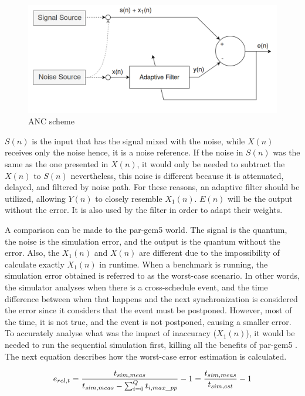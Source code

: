 \begin{figure}[H]
	\centering
 	\includegraphics[width=0.7\linewidth]{Images/AdaptiveNoiseCancellationScheme.png}
 	\caption{ANC scheme}
	 \label{fig_AdaptiveNoiseCancellationScheme}
\end{figure}

$S(n)$ is the input that has the signal mixed with the noise, while $X(n)$ receives only the noise hence, it is a noise reference. If the noise 
in $S(n)$ was the same as the one presented in $X(n)$, it would only be needed to subtract the $X(n)$ to $S(n)$ nevertheless, this noise is 
different because it is attenuated, delayed, and filtered by noise path. For these reasons, an adaptive filter should be utilized, allowing 
$Y(n)$ to closely resemble $X_{1}(n)$. $E(n)$ will be the output without the error. It is also used by the filter in order to adapt their weights.

A comparison can be made to the par-gem5 world. The signal is the quantum, the noise is the simulation error, and the output is the quantum 
without the error. Also, the $X_{1}(n)$ and $X(n)$ are different due to the impossibility of calculate exactly $X_{1}(n)$ in runtime. When a 
benchmark is running, the simulation error obtained is referred to as the worst-case scenario. In other words, the simulator analyses when there 
is a cross-schedule event, and the time difference between when that happens and the next synchronization is considered the error since it 
considers that the event must be postponed. However, most of the time, it is not true, and the event is not postponed, causing a smaller error. To 
accurately analyse what was the impact of inaccuracy ($X_{1}(n)$), it would be needed to run the sequential simulation first, killing 
all the benefits of par-gem5 \cite{pargem5}. The next equation describes how the worst-case error estimation is calculated. 

\begin{equation}
    \label{eq_errSim}
    \centering
        \Large
        e_{rel,t} = \frac{t_{sim,meas}}{t_{sim,meas}-\sum_{i=0}^{Q}t_{i,max\_pp}} -1  = \frac{t_{sim,meas}}{t_{sim,est}}-1
        \normalsize
\end{equation}
\vspace{0.3cm}

